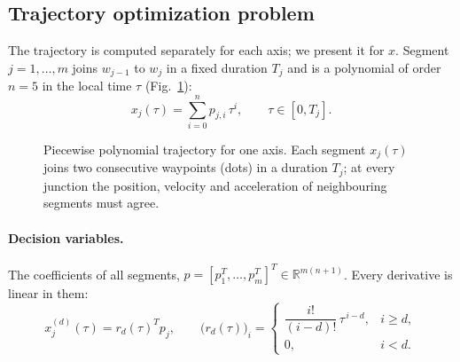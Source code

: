 \subsection{Trajectory optimization problem}
The trajectory is computed separately for each axis; we present it for $x$. Segment $j=1,\dots,m$ joins $w_{j-1}$ to $w_j$ in a fixed duration $T_j$ and is a polynomial of order $n=5$ in the local time $\tau$ (Fig.~\ref{fig:segments}):
\begin{equation}
x_j(\tau) = \sum_{i=0}^{n} p_{j,i}\,\tau^{i}, \qquad \tau\in[0,T_j].
\label{eq:poly}
\end{equation}

\begin{figure}[htbp]
\centering
{}
\caption{Piecewise polynomial trajectory for one axis. Each segment $x_j(\tau)$ joins two consecutive waypoints (dots) in a duration $T_j$; at every junction the position, velocity and acceleration of neighbouring segments must agree.}
\label{fig:segments}
\end{figure}

\paragraph{Decision variables.}
The coefficients of all segments, $p = [p_1^T,\dots,p_m^T]^T \in \mathbb{R}^{m(n+1)}$. Every derivative is linear in them:
\begin{equation}
x_j^{(d)}(\tau) = r_d(\tau)^T p_j, \qquad
\big(r_d(\tau)\big)_i =
\begin{cases}
\dfrac{i!}{(i-d)!}\,\tau^{\,i-d}, & i \ge d,\\[4pt]
0, & i < d.
\end{cases}
\label{eq:derivative}
\end{equation}

